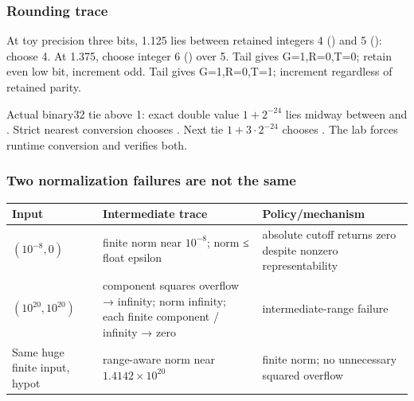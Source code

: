 \subsubsection{Rounding trace}\label{appendix-92ff77d4dfdc-rounding-trace}

\hypertarget{appendix-92ff77d4dfdc-rounding-trace}{}

At toy precision three bits, 1.125 lies between retained integers 4 () and 5 (): choose 4. At 1.375, choose integer 6 () over 5. Tail \BookInlineCode{1000\ldots{}} gives G=1,R=0,T=0; retain even low bit, increment odd. Tail \BookInlineCode{1010\ldots{}} gives G=1,R=0,T=1; increment regardless of retained parity.

Actual binary32 tie above 1: exact double value \(1+2^{-24}\) lies midway between  and . Strict nearest conversion chooses . Next tie \(1+3\cdot2^{-24}\) chooses . The lab forces runtime conversion and verifies both.

\subsubsection{Two normalization failures are not the same}\label{appendix-92ff77d4dfdc-two-normalization-failures-are-not-the-same}

\hypertarget{appendix-92ff77d4dfdc-two-normalization-failures-are-not-the-same}{}

{\def\LTcaptype{none} %
\begin{longtable}[]{@{}
  >{\raggedright\arraybackslash}p{}
  >{\raggedright\arraybackslash}p{}
  >{\raggedright\arraybackslash}p{}@{}}
\toprule\noalign{}
\begin{minipage}[b]{\linewidth}\raggedright
Input
\end{minipage} & \begin{minipage}[b]{\linewidth}\raggedright
Intermediate trace
\end{minipage} & \begin{minipage}[b]{\linewidth}\raggedright
Policy/mechanism
\end{minipage} \\
\midrule\noalign{}
\endhead
\bottomrule\noalign{}
\endlastfoot
\((10^{-8},0)\) & finite norm near \(10^{-8}\); norm ≤ float epsilon & absolute cutoff returns zero despite nonzero representability \\
\((10^{20},10^{20})\) & component squares overflow → infinity; norm infinity; each finite component / infinity → zero & intermediate-range failure \\
Same huge finite input, hypot & range-aware norm near \(1.4142\times10^{20}\) & finite norm; no unnecessary squared overflow \\
\end{longtable}
}

